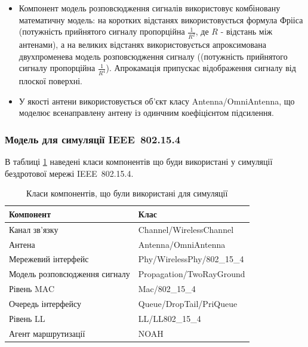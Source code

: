 \documentclass[a4paper,ukrainian,utf8,nocolumnsxix,floatsection,equationsection]{eskdtext}
\renewcommand\paragraph{\subsubsection}
\newcommand{\iee}[0]{IEEE~802.15.4\xspace}
\begin{document}
\begin{itemize}
	\item Компонент модель розповсюдження сигналів використовує комбіновану математичну модель: на коротких відстанях використовується формула Фрііса (потужність прийнятого сигналу пропорційна $\frac{1}{R^2}$, де $R$ - відстань між антенами), а на великих відстанях використовується апроксимована двухпроменева модель розповсюдження сигналу ((потужність прийнятого сигналу пропорційна $\frac{1}{R^4}$). Апрокамація припускає відображення сигналу від плоскої поверхні. 

	\item У якості антени використовується об’єкт класу Antenna/OmniAntenna, що моделює всенаправлену антену із одинчним коефіцієнтом підсилення. 
\end{itemize}

\paragraph{Модель для симуляції \iee}

В таблиці \ref{tbl:simulation_classes} наведені класи компонентів що буди використані у симуляції бездротової мережі \iee.

\begin{table}[htbp]
\caption{Класи компонентів, що були використані для симуляції}
\centering
\begin{tabular}{|l|l|}
\hline
Компонент                     & Клас                       \\ \hline
Канал зв’язку                 & Channel/WirelessChannel    \\ \hline
Антена                        & Antenna/OmniAntenna        \\ \hline
Мережевий інтерфейс           & Phy/WirelessPhy/802\_15\_4 \\ \hline
Модель розповсюдження сигналу & Propagation/TwoRayGround   \\ \hline
Рівень MAC                    & Mac/802\_15\_4             \\ \hline
Очередь інтерфейсу            & Queue/DropTail/PriQueue    \\ \hline
Рівень LL                     & LL/LL802\_15\_4            \\ \hline
Агент маршрутизації           & NOAH                       \\ \hline
\end{tabular}
\label{tbl:simulation_classes}
\end{table}
\end{document}
